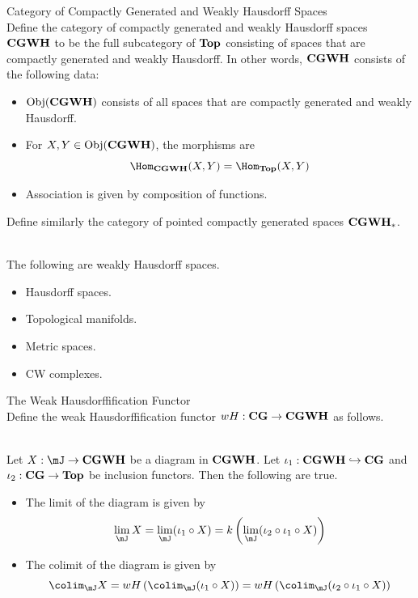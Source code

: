 \documentclass[a4paper]{article}
\begin{document}
\begin{defn}{Category of Compactly Generated and Weakly Hausdorff Spaces}{}\\
Define the category of compactly generated and weakly Hausdorff spaces $\bold{CGWH}$ to be the full subcategory of $\bold{Top}$ consisting of spaces that are compactly generated and weakly Hausdorff. In other words, $\bold{CGWH}$ consists of the following data: 
\begin{itemize}
\item $\text{Obj}(\bold{CGWH})$ consists of all spaces that are compactly generated and weakly Hausdorff. 
\item For $X,Y\in\text{Obj}(\bold{CGWH})$, the morphisms are $$\Hom_{\bold{CGWH}}(X,Y)=\Hom_{\bold{Top}}(X,Y)$$
\item Association is given by composition of functions. 
\end{itemize}
Define similarly the category of pointed compactly generated spaces $\bold{CGWH}_\ast$. 
\end{defn}

\begin{eg}{}{}\\
The following are weakly Hausdorff spaces. 
\begin{itemize}
\item Hausdorff spaces. 
\item Topological manifolds. 
\item Metric spaces. 
\item CW complexes. 
\end{itemize}
\end{eg}

\begin{defn}{The Weak Hausdorffification Functor}{}\\
Define the weak Hausdorffification functor $wH:\bold{CG}\to\bold{CGWH}$ as follows. 
\end{defn}

\begin{prp}{}{}\\
Let $X:\mJ\to\bold{CGWH}$ be a diagram in $\bold{CGWH}$. Let $\iota_1:\bold{CGWH}\hookrightarrow\bold{CG}$ and $\iota_2:\bold{CG}\to\bold{Top}$ be inclusion functors. Then the following are true. 
\begin{itemize}
\item The limit of the diagram is given by $$\lim_\mJ X=\lim_\mJ(\iota_1\circ X)=k\left(\lim_\mJ(\iota_2\circ\iota_1\circ X)\right)$$
\item The colimit of the diagram is given by $$\colim_\mJ X=wH\left(\colim_\mJ(\iota_1\circ X)\right)=wH\left(\colim_\mJ(\iota_2\circ\iota_1\circ X)\right)$$
\end{itemize}
\end{prp}
\end{document}
